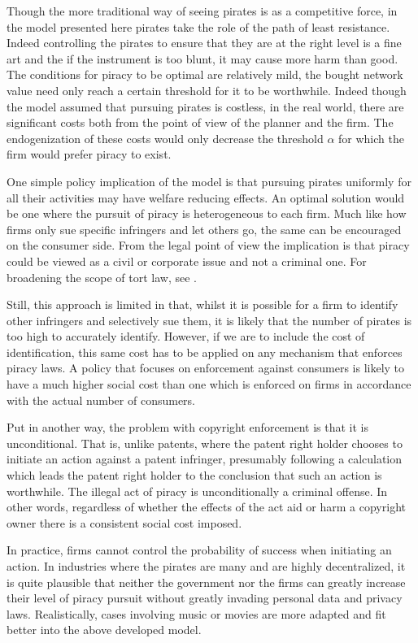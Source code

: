 Though the more traditional way of seeing pirates is as a competitive force, in the model presented here pirates take the role of the path of least resistance. Indeed controlling the pirates to ensure that they are at the right level is a fine art and the if the instrument is too blunt, it may cause more harm than good. The conditions for piracy to be optimal are relatively mild, the bought network value need only reach a certain threshold for it to be worthwhile. Indeed though the model assumed that pursuing pirates is costless, in the real world, there are significant costs both from the point of view of the planner and the firm. The endogenization of these costs would only decrease the threshold $\alpha$ for which the firm would prefer piracy to exist.

One simple policy implication of the model is that pursuing pirates uniformly for all their activities may have welfare reducing effects. An optimal solution would be one where the pursuit of piracy is  heterogeneous to each firm. Much like how firms only sue specific infringers and let others go, the same can be encouraged on the consumer side. From the legal point of view the implication is that piracy could be viewed as a civil or corporate issue and not a criminal one. For broadening the scope of tort law, see \citep{DF96}. 

Still, this approach is limited in that, whilst it is possible for a firm to identify other infringers and selectively sue them, it is likely that the number of pirates is too high to accurately identify. However, if we are to include the cost of identification, this same cost has to be applied on any mechanism that enforces piracy laws. A policy that focuses on enforcement against consumers is likely to have a much higher social cost than one which is enforced on firms in accordance with the actual number of consumers. 

Put in another way, the problem with copyright enforcement is that it is unconditional. That is, unlike patents, where the patent right holder chooses to initiate an action against a patent infringer, presumably following a calculation which leads the patent right holder to the conclusion that such an action is worthwhile. The illegal act of piracy is unconditionally a criminal offense. In other words, regardless of whether the effects of the act aid or harm a copyright owner there is a consistent social cost imposed. 

In practice, firms cannot control the probability of success when initiating an action. In industries where the pirates are many and are highly decentralized, it is quite plausible that neither the government nor the firms can greatly increase their level of piracy pursuit without greatly invading personal data and privacy laws. Realistically, cases involving music or movies are more adapted and fit better into the above developed model. 

